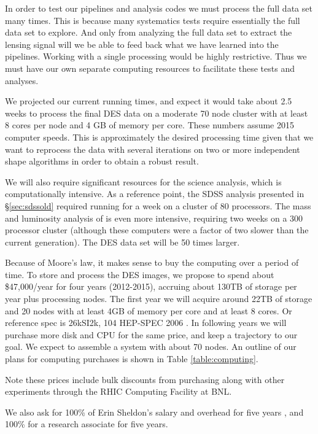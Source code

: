 \documentclass[12pt]{article}
\begin{document}
In order to test our pipelines and analysis codes we must process the full data
set many times.  This is because many systematics tests require essentially
the full data set to explore.  And only from analyzing the full data set to
extract the lensing signal will we be able to feed back what we have learned
into the pipelines.  Working with a single processing would be highly
restrictive.  Thus we must have our own separate computing resources to
facilitate these tests and analyses.  

We projected our current running times, and expect it would take about 2.5
weeks to process the final DES data on a moderate 70 node cluster with at least
8 cores per node and 4 GB of memory per core.  These  numbers assume 2015
computer speeds. This is approximately the desired processing time given that
we want to reprocess the data with several iterations on two or more
independent shape algorithms in order to obtain a robust result.

We will also require significant resources for the science analysis, which is
computationally intensive.  As a reference point, the SDSS analysis presented
in \S \ref{sec:sdssold} required running for a week on a cluster of 80
processors.  The mass and luminosity analysis of \cite{SheldonM2L07} is even
more intensive, requiring two weeks on a 300 processor cluster (although these
computers were a factor of two slower than the current generation).  The DES
data set will be 50 times larger.

Because of Moore's law, it makes sense to buy the computing over a period of
time.  To store and process the DES images, we propose to spend about
\$47,000/year for four years (2012-2015), accruing about 130TB of storage per
year plus processing nodes.  The first year we will acquire around 22TB of
storage and 20 nodes with at least 4GB of memory per core and at least 8 cores.
Or reference spec is  26kSI2k, 104 HEP-SPEC 2006 .  In following years we will
purchase more disk and CPU for the same price, and keep a trajectory to our
goal.  We expect to assemble a system with about 70 nodes.  An outline of our plans
for computing purchases is shown in Table \ref{table:computing}.

Note these prices include bulk discounts from purchasing along with other
experiments through the RHIC Computing Facility at BNL.  





We also ask for 100\%  of Erin Sheldon's salary and overhead for five years ,
and 100\% for a research associate for five years.  
\end{document}
